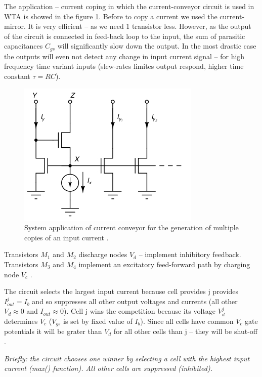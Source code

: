 The application -- current coping in which the current-conveyor circuit is used in WTA is showed in the figure \ref{fig:current_conveyor_application}. Before to copy a current we used the current-mirror. It is very efficient -- as we need 1 transistor less. However, as the output of the circuit is connected in feed-back loop to the input, the sum of parasitic capacitances $C_{gs}$ will significantly slow down the output. In the most drastic case the outputs will even not detect any change in input current signal -- for high frequency time variant inputs (slew-rates limites output respond, higher time constant $\tau = RC$).

\begin{figure}[htbp]
  \centering
  \includegraphics[scale=0.8]{pics/current_conveyor_application.jpg}
  \caption{System application of current conveyor for the generation of multiple copies of an input current \cite{book:VLSI}.}
  \label{fig:current_conveyor_application}
\end{figure} 

Transistors $M_1$ and $M_2$ discharge nodes $V_d$ -- implement inhibitory feedback. Transistors $M_3$ and $M_4$
 implement an excitatory feed-forward path by charging node $V_c$ . 
 
 The circuit selects the largest input current because cell provides j provides $I_{out}^j = I_b$  and so suppresses all other output voltages and currents (all other $V_d \approx 0$ and $I_{out} \approx 0$). Cell j wins the competition because its voltage $V_d^j$
determines $V_c$ ($V_{gs}$ is set by fixed value of $I_b$). Since all cells have common $V_c$ gate potentials it will be grater than $V_d$ for all other cells than j -- they will be shut-off \cite{book:VLSI}. 




\textit{Briefly: the circuit chooses one winner by selecting a cell with the highest input current (max() function). All other cells are suppressed (inhibited).}

